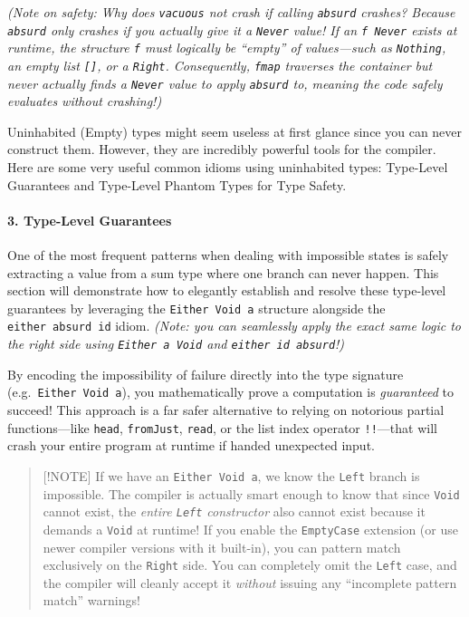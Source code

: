 \documentclass[
]{article}
\begin{document}
\emph{(Note on safety: Why does \texttt{vacuous} not crash if calling
\texttt{absurd} crashes? Because \texttt{absurd} only crashes if you
actually give it a \texttt{Never} value! If an \texttt{f\ Never} exists
at runtime, the structure \texttt{f} must logically be ``empty'' of
values---such as \texttt{Nothing}, an empty list \texttt{{[}{]}}, or a
\texttt{Right}. Consequently, \texttt{fmap} traverses the container but
never actually finds a \texttt{Never} value to apply \texttt{absurd} to,
meaning the code safely evaluates without crashing!)}

Uninhabited (Empty) types might seem useless at first glance since you
can never construct them. However, they are incredibly powerful tools
for the compiler. Here are some very useful common idioms using
uninhabited types: Type-Level Guarantees and Type-Level Phantom Types
for Type Safety.

\paragraph{3. Type-Level Guarantees}\label{type-level-guarantees}

One of the most frequent patterns when dealing with impossible states is
safely extracting a value from a sum type where one branch can never
happen. This section will demonstrate how to elegantly establish and
resolve these type-level guarantees by leveraging the
\texttt{Either\ Void\ a} structure alongside the
\texttt{either\ absurd\ id} idiom. \emph{(Note: you can seamlessly apply
the exact same logic to the right side using \texttt{Either\ a\ Void}
and \texttt{either\ id\ absurd}!)}

By encoding the impossibility of failure directly into the type
signature (e.g.~\texttt{Either\ Void\ a}), you mathematically prove a
computation is \emph{guaranteed} to succeed! This approach is a far
safer alternative to relying on notorious partial functions---like
\texttt{head}, \texttt{fromJust}, \texttt{read}, or the list index
operator \texttt{!!}---that will crash your entire program at runtime if
handed unexpected input.

\begin{quote}
{[}!NOTE{]} If we have an \texttt{Either\ Void\ a}, we know the
\texttt{Left} branch is impossible. The compiler is actually smart
enough to know that since \texttt{Void} cannot exist, the \emph{entire
\texttt{Left} constructor} also cannot exist because it demands a
\texttt{Void} at runtime! If you enable the \texttt{EmptyCase} extension
(or use newer compiler versions with it built-in), you can pattern match
exclusively on the \texttt{Right} side. You can completely omit the
\texttt{Left} case, and the compiler will cleanly accept it
\emph{without} issuing any ``incomplete pattern match'' warnings!
\end{quote}
\end{document}
